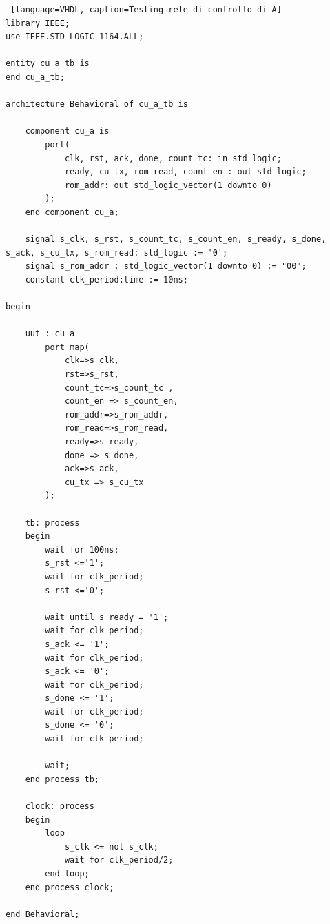 \begin{lstlisting} [language=VHDL, caption=Testing rete di controllo di A]
library IEEE;
use IEEE.STD_LOGIC_1164.ALL;

entity cu_a_tb is
end cu_a_tb;

architecture Behavioral of cu_a_tb is

    component cu_a is
        port(
            clk, rst, ack, done, count_tc: in std_logic;
            ready, cu_tx, rom_read, count_en : out std_logic;
            rom_addr: out std_logic_vector(1 downto 0)
        );
    end component cu_a;

    signal s_clk, s_rst, s_count_tc, s_count_en, s_ready, s_done, s_ack, s_cu_tx, s_rom_read: std_logic := '0';
    signal s_rom_addr : std_logic_vector(1 downto 0) := "00";
    constant clk_period:time := 10ns;

begin

    uut : cu_a
        port map(
            clk=>s_clk,
            rst=>s_rst,
            count_tc=>s_count_tc ,
            count_en => s_count_en,
            rom_addr=>s_rom_addr,
            rom_read=>s_rom_read,
            ready=>s_ready,
            done => s_done,
            ack=>s_ack,
            cu_tx => s_cu_tx
        );

    tb: process
    begin
        wait for 100ns;
        s_rst <='1';
        wait for clk_period;
        s_rst <='0';

        wait until s_ready = '1';
        wait for clk_period;
        s_ack <= '1';
        wait for clk_period;
        s_ack <= '0';
        wait for clk_period;
        s_done <= '1';
        wait for clk_period;
        s_done <= '0';
        wait for clk_period;
    
        wait;
    end process tb;

    clock: process
    begin
        loop
            s_clk <= not s_clk;
            wait for clk_period/2;
        end loop;
    end process clock;

end Behavioral;

\end{lstlisting}

